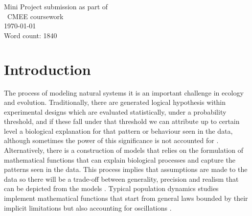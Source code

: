 \documentclass[11]{article}
\begin{document}
\begin{titlepage}
    
    
    {\large Mini Project submission as part of }\\[0.5cm]
    {\large \ CMEE coursework }\\[0.5cm] %
    {\large \today}\\[1cm] %
    {\large Word count: 1840}
    
    \vfill %

\end{titlepage}
    
    
    \onehalfspacing
    \linenumbers


    \section{Introduction}

The process of modeling natural systems it is an important challenge in ecology and evolution. Traditionally, there are generated logical hypothesis within experimental designs which are evaluated statistically, under a probability threshold, and if these fall under that threshold we can attribute up to certain level a biological explanation for that pattern or behaviour seen in the data, although sometimes the power of this significance is not accounted for \cite{johnson1999insignificance}. Alternatively, there is a construction of models that relies on the formulation of mathematical functions that can explain biological processes and capture the patterns seen in the data. This process implies that assumptions are made to the data so there will be a trade-off between generality, precision and realism that can be depicted from the models \cite{levins1966strategy}. Typical population dynamics studies implement mathematical functions that start from general laws bounded by their implicit limitations but also accounting for oscillations \cite{turchin2013complex}.
\end{document}
